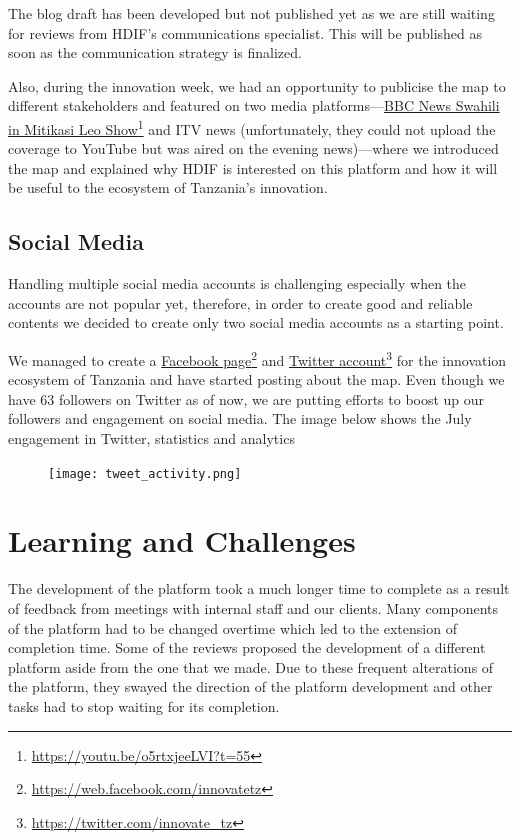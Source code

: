 \documentclass[a4paper,12pt,twoside]{article}
\begin{document}
The blog draft has been developed but not published yet as we are still waiting for reviews from HDIF's communications specialist. This will be published as soon as the communication strategy is finalized.

Also, during the innovation week, we had an opportunity to publicise the map to different stakeholders and featured on two media platforms---\href{https://youtu.be/o5rtxjeeLVI?t=55}{BBC News Swahili in Mitikasi Leo Show}\footnote{\url{https://youtu.be/o5rtxjeeLVI?t=55}} and ITV news (unfortunately, they could not upload the coverage to YouTube but was aired on the evening news)---where we introduced the map and explained why HDIF is interested on this platform and how it will be useful to the ecosystem of Tanzania's innovation.

\subsection{Social Media}
Handling multiple social media accounts is challenging especially when the accounts are not popular yet, therefore, in order to create good and reliable contents we decided to create only two social media accounts as a starting point.

We managed to create a \href{https://web.facebook.com/innovatetz}{Facebook page}\footnote{\url{https://web.facebook.com/innovatetz}} and \href{https://twitter.com/innovate_tz}{Twitter account}\footnote{\url{https://twitter.com/innovate_tz}} for the innovation ecosystem of Tanzania and have started posting about the map. Even though we have 63 followers on Twitter as of now, we are putting efforts to boost up our followers and engagement on social media. The image below shows the July engagement in Twitter, statistics and analytics 

\begin{figure}[h]
    \centering
    \texttt{[image: tweet\_activity.png]}
\end{figure}

\newpage
\section{Learning and Challenges}
\textbf{\color{OMDTZblue}{Web Platform}}

The development of the platform took a much longer time to complete as a result of feedback from meetings with internal staff and our clients. Many components of the platform had to be changed overtime which led to the extension of completion time. Some of the reviews proposed the development of a different platform aside from the one that we made. Due to these frequent alterations of the platform, they swayed the direction of the platform development and other tasks had to stop waiting for its completion.
\end{document}
